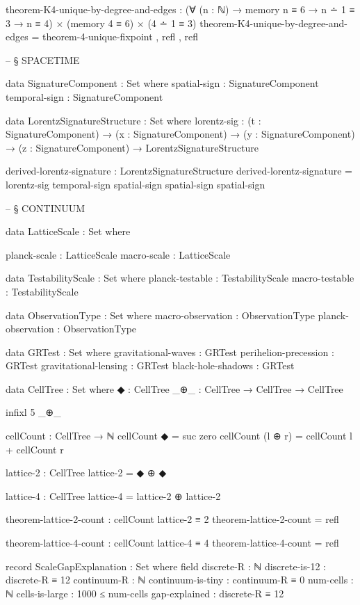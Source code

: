 \documentclass[11pt,a4paper]{book}
\begin{document}
\begin{code}
theorem-K4-unique-by-degree-and-edges : 
  (∀ (n : ℕ) → memory n ≡ 6 → n ∸ 1 ≡ 3 → n ≡ 4) × (memory 4 ≡ 6) × (4 ∸ 1 ≡ 3)
theorem-K4-unique-by-degree-and-edges = theorem-4-unique-fixpoint , refl , refl


-- § SPACETIME

data SignatureComponent : Set where
  spatial-sign  : SignatureComponent
  temporal-sign : SignatureComponent

data LorentzSignatureStructure : Set where
  lorentz-sig : (t : SignatureComponent) → 
                (x : SignatureComponent) → 
                (y : SignatureComponent) → 
                (z : SignatureComponent) → 
                LorentzSignatureStructure

derived-lorentz-signature : LorentzSignatureStructure
derived-lorentz-signature = lorentz-sig temporal-sign spatial-sign spatial-sign spatial-sign


-- § CONTINUUM

data LatticeScale : Set where

  planck-scale : LatticeScale
  macro-scale  : LatticeScale

data TestabilityScale : Set where
  planck-testable : TestabilityScale
  macro-testable : TestabilityScale

data ObservationType : Set where
  macro-observation : ObservationType
  planck-observation : ObservationType

data GRTest : Set where
  gravitational-waves : GRTest
  perihelion-precession : GRTest
  gravitational-lensing : GRTest
  black-hole-shadows : GRTest

data CellTree : Set where
  ◆   : CellTree
  _⊕_ : CellTree → CellTree → CellTree

infixl 5 _⊕_

cellCount : CellTree → ℕ
cellCount ◆       = suc zero
cellCount (l ⊕ r) = cellCount l + cellCount r

lattice-2 : CellTree
lattice-2 = ◆ ⊕ ◆

lattice-4 : CellTree
lattice-4 = lattice-2 ⊕ lattice-2

theorem-lattice-2-count : cellCount lattice-2 ≡ 2
theorem-lattice-2-count = refl

theorem-lattice-4-count : cellCount lattice-4 ≡ 4
theorem-lattice-4-count = refl

record ScaleGapExplanation : Set where
  field
    discrete-R : ℕ
    discrete-is-12 : discrete-R ≡ 12
    continuum-R : ℕ
    continuum-is-tiny : continuum-R ≡ 0
    num-cells : ℕ
    cells-is-large : 1000 ≤ num-cells
    gap-explained : discrete-R ≡ 12


\end{code}
\end{document}
